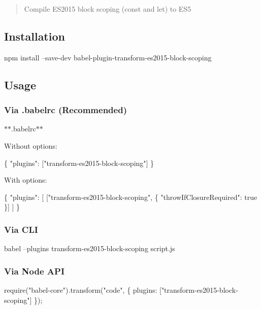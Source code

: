 \begin{quote}
Compile E\+S2015 block scoping (const and let) to E\+S5 \end{quote}


\subsection*{Installation}


\begin{DoxyCode}
npm install --save-dev babel-plugin-transform-es2015-block-scoping
\end{DoxyCode}


\subsection*{Usage}

\subsubsection*{Via {\ttfamily .babelrc} (Recommended)}

$\ast$$\ast$.babelrc$\ast$$\ast$

Without options\+:


\begin{DoxyCode}
\{
  "plugins": ["transform-es2015-block-scoping"]
\}
\end{DoxyCode}


With options\+:


\begin{DoxyCode}
\{
  "plugins": [
    ["transform-es2015-block-scoping", \{
      "throwIfClosureRequired": true
    \}]
  ]
\}
\end{DoxyCode}


\subsubsection*{Via C\+LI}


\begin{DoxyCode}
babel --plugins transform-es2015-block-scoping script.js
\end{DoxyCode}


\subsubsection*{Via Node A\+PI}


\begin{DoxyCode}
require("babel-core").transform("code", \{
  plugins: ["transform-es2015-block-scoping"]
\});
\end{DoxyCode}


